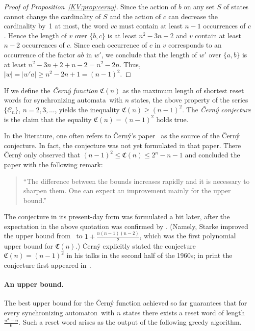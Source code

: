 \documentclass{irmaart}
\newcommand{\sa}{synchronizing au\-tom\-a\-ta}
\newcommand{\san}{synchronizing au\-tom\-a\-ton}
\theoremstyle{plain}
\begin{document}
\begin{proof}[Proof of Proposition~\ref{KV:prop:cerny}]
Since the action of $b$ on any set $S$ of states cannot change the
cardinality of $S$ and the action of $c$ can decrease the
cardinality by~1 at most, the word $vc$ must contain at least
$n-1$ occurrences of $c$. Hence the length of $v$ over $\{b,c\}$
is at least $n^2-3n+2$ and $v$ contain at least $n-2$ occurrences
of $c$. Since each occurrence of $c$ in $v$ corresponds to an
occurrence of the factor $ab$ in $w'$, we conclude that the length
of $w'$ over $\{a,b\}$ is at least $n^2-3n+2+n-2=n^2-2n$. Thus,
$|w|=|w'a|\ge n^2-2n+1=(n-1)^2$.
\end{proof}

If we define the \emph{\v{C}ern\'{y} function}
$\mathfrak{C}(n)$ as the maximum length of shortest reset words for \sa\ with
$n$ states, the above property of the series $\{\mathcal{C}_{n}\}$,
$n=2,3,\dotsc$, yields the inequality $\mathfrak{C}(n)\ge(n-1)^2$. The
\emph{\v{C}ern\'{y} conjecture} is the claim
that the equality $\mathfrak{C}(n)=(n-1)^2$ holds true.

In the literature, one often refers to \v{C}ern\'{y}'s paper~\cite{Cerny:1964}
as the source of the \v{C}ern\'{y} conjecture. In fact, the conjecture was not
yet formulated in that paper. There \v{C}ern\'{y} only observed that
$(n-1)^2\le \mathfrak{C}(n)\le 2^n-n-1$ and concluded the paper with the
following remark:
\begin{quote}
``The difference between the bounds increases rapidly and it is necessary to
sharpen them. One can expect an improvement mainly for the upper bound.''
\end{quote}
The conjecture in its present-day form was formulated a bit later, after the
expectation in the above quotation was confirmed by \cite{Starke:1966}.
(Namely, Starke improved the upper bound from~\cite{Cerny:1964} to
$1+\frac{n(n-1)(n-2)}2$, which was the first polynomial upper bound for
$\mathfrak{C}(n)$.) \v{C}ern\'{y} explicitly stated the conjecture
$\mathfrak{C}(n)=(n-1)^2$ in his talks in the second half of the 1960s; in
print the conjecture first appeared in~\cite{Cerny&Piricka&Rosenauerova:1971}.

\paragraph*{An upper bound.} The best upper bound for the \v{C}ern\'{y}
function achieved so far guarantees that for every \san\ with $n$ states there
exists a reset word of length $\frac{n^3-n}6$. Such a reset word arises as the
output of the following greedy algorithm.
\end{document}
